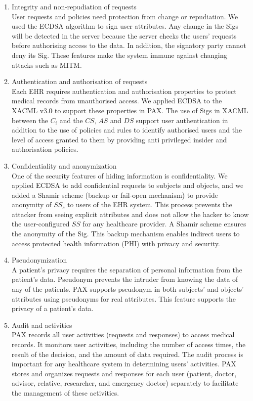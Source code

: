 \documentclass[journal,article,submit,moreauthors,pdftex]{Definitions/mdpi}
\begin{document}
\begin{enumerate}
  \item Integrity and non-repudiation of requests\\
User requests and policies need protection from change or repudiation. We used the ECDSA algorithm to sign user attributes. Any change in the Sigs will be detected in the server because the server checks the users' requests before authorising access to the data. In addition, the signatory party cannot deny its Sig. These features make the system immune against changing attacks such as MITM.
  \item Authentication and authorisation of requests\\
Each EHR requires authentication and authorisation properties to protect medical records from unauthorised access. We applied ECDSA to the XACML v3.0 to support these properties in PAX. The use of Sigs in XACML between the $C_i$ and the $CS$, $AS$ and $DS$ support user authentication in addition to the use of policies and rules to identify authorised users and the level of access granted to them by providing anti privileged insider and authorisation policies.
  \item Confidentiality and anonymization\\
One of the security features of hiding information is confidentiality. We applied ECDSA to add confidential requests to subjects and objects, and we added a Shamir scheme (backup or fail-open mechanism) to provide anonymity of $SS_s$ to users of the EHR system. This process prevents the attacker from seeing explicit attributes and does not allow the hacker to know the user-configured $SS$ for any healthcare provider. A Shamir scheme ensures the anonymity of the Sig. This backup mechanism enables indirect users to access protected health information (PHI) with privacy and security.
  \item Pseudonymization\\
A patient's privacy requires the separation of personal information from the patient's data. Pseudonym prevents the intruder from knowing the data of any of the patients. PAX supports pseudonym in both subjects' and objects' attributes using pseudonyms for real attributes. This feature supports the privacy of a patient's data.
  \item Audit and activities\\
PAX records all user activities (requests and responses) to access medical records. It monitors user activities, including the number of access times, the result of the decision, and the amount of data required. The audit process is important for any healthcare system in determining users' activities. PAX stores and organizes requests and responses for each user (patient, doctor, advisor, relative, researcher, and emergency doctor) separately to facilitate the management of these activities.
\end{enumerate}
\end{document}
